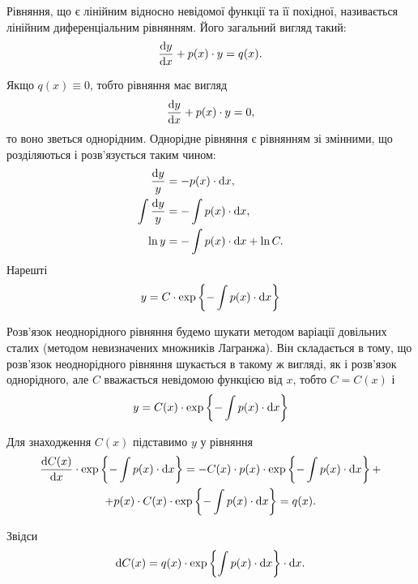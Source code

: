 Рівняння, що є лінійним відносно невідомої функції та її похідної, називається лінійним диференціальним рівнянням. Його загальний вигляд такий:
\begin{equation*}
	\frac{\mathop{}\!\mathrm{d} y}{\mathop{}\!\mathrm{d} x} + p(x) \cdot y = q(x).
\end{equation*}

Якщо $q(x) \equiv 0$, тобто рівняння має вигляд
\begin{equation*}
	\frac{\mathop{}\!\mathrm{d} y}{\mathop{}\!\mathrm{d} x} + p(x) \cdot y = 0,
\end{equation*}
то воно зветься однорідним. Однорідне рівняння є рівнянням зі змінними, що розділяються і розв’язується таким чином:
\begin{align*}
	\frac{\mathop{}\!\mathrm{d} y}{y} &= -p(x) \cdot \mathop{}\!\mathrm{d} x, \\
	\int \frac{\mathop{}\!\mathrm{d} y}{y} &= - \int p(x) \cdot \mathop{}\!\mathrm{d} x, \\
	\ln y &= - \int p(x) \cdot \mathop{}\!\mathrm{d} x + \ln C.
\end{align*}
Нарешті 
\begin{equation*}
	y = C \cdot \exp \left\{ - \int p(x) \cdot \mathop{}\!\mathrm{d} x \right\}
\end{equation*}

Розв’язок неоднорідного рівняння будемо шукати методом варіації довільних сталих (методом невизначених множників Лагранжа). Він складається в тому, що розв’язок неоднорідного рівняння шукається в такому ж вигляді, як і розв’язок однорідного, але $C$ вважається невідомою функцією від $x$, тобто $C = C(x)$ і 
\begin{equation*}
	y = C(x) \cdot \exp \left\{ - \int p(x) \cdot \mathop{}\!\mathrm{d} x \right\}	
\end{equation*}

Для знаходження $C(x)$ підставимо $y$ у рівняння
\begin{multline*} 
	\frac{\mathop{}\!\mathrm{d} C(x)}{\mathop{}\!\mathrm{d} x} \cdot \exp \left\{ - \int p(x) \cdot \mathop{}\!\mathrm{d} x \right\} = - C(x) \cdot p(x) \cdot \exp \left\{ - \int p(x) \cdot \mathop{}\!\mathrm{d} x \right\} + \\
	+ p(x) \cdot C(x) \cdot \exp \left\{ - \int p(x) \cdot \mathop{}\!\mathrm{d} x \right\} = q(x).
\end{multline*}

Звідси
\begin{equation*} 
	\mathop{}\!\mathrm{d} C(x) = q(x) \cdot \exp \left\{\int p(x) \cdot \mathop{}\!\mathrm{d} x \right\} \cdot \mathop{}\!\mathrm{d} x.
\end{equation*}

